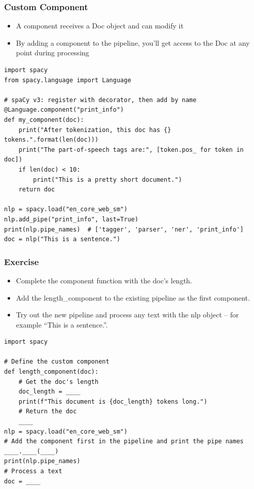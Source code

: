 \begin{frame}[fragile]\frametitle{Custom Component}
  \begin{itemize}
    \item A component receives a Doc object and can modify it


\item  By adding a component to the pipeline, you'll get access to the Doc at any point during processing
  \end{itemize}
	
		\begin{lstlisting}
import spacy
from spacy.language import Language

# spaCy v3: register with decorator, then add by name
@Language.component("print_info")
def my_component(doc):
    print("After tokenization, this doc has {} tokens.".format(len(doc)))
    print("The part-of-speech tags are:", [token.pos_ for token in doc])
    if len(doc) < 10:
        print("This is a pretty short document.")
    return doc

nlp = spacy.load("en_core_web_sm")
nlp.add_pipe("print_info", last=True)
print(nlp.pipe_names)  # ['tagger', 'parser', 'ner', 'print_info']
doc = nlp("This is a sentence.")
\end{lstlisting}	
	
\end{frame}

\begin{frame}[fragile]\frametitle{Exercise}

  \begin{itemize}
    \item Complete the component function with the doc’s length.
    \item Add the length\_component to the existing pipeline as the first component.
    \item Try out the new pipeline and process any text with the nlp object – for example “This is a sentence.”.
  \end{itemize}

  \begin{lstlisting}
import spacy

# Define the custom component
def length_component(doc):
    # Get the doc's length
    doc_length = ____
    print(f"This document is {doc_length} tokens long.")
    # Return the doc
    ____
nlp = spacy.load("en_core_web_sm")
# Add the component first in the pipeline and print the pipe names
____.____(____)
print(nlp.pipe_names)
# Process a text
doc = ____
  \end{lstlisting}

\end{frame}

